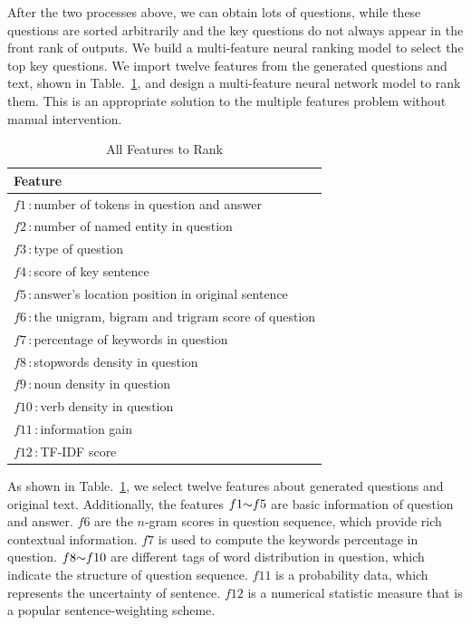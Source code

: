\documentclass[runningheads,UTF8,article]{comsis2}
\begin{document}
	After the two processes above, we can obtain lots of questions, while these questions are sorted arbitrarily and the key questions do not always appear in the front rank of outputs. We build a multi-feature neural ranking model to select the top key questions. We import twelve features from the generated questions and text, shown in Table.~\ref{features}, and design a multi-feature neural network model to rank them. This is an appropriate solution to the multiple features problem without manual intervention. 
	\begin{table}[!th]
		\centering
		\caption{All Features to Rank}
		\label{features}
		\setlength\tabcolsep{0.5em}
		\begin{tabular}{|p{200pt}|}
			\hline
			\textbf{Feature} \\
			\hline
			$ f1 $\,:\,number of tokens in question and answer\\ 
			$ f2 $\,:\,number of named entity in question \\   
			$ f3 $\,:\,type of question \\ 
			$ f4 $\,:\,score of key sentence  \\ 
			$ f5 $\,:\,answer's location position in original sentence  \\ 
			$ f6 $\,:\,the unigram, bigram and trigram score of question\\     			
			$ f7 $\,:\,percentage of keywords in question \\
			$ f8 $\,:\,stopwords density in question\\	
			$ f9 $\,:\,noun density in question\\
			$ f10 $\,:\,verb density in question \\
			
			$f11$\,:\,information gain \\
			$f12$\,:\,TF-IDF score   \\
			\hline 
		\end{tabular}	
	\end{table}
	
	
	
	
	
	As shown in Table.~\ref{features}, we select twelve features about generated questions and original text.
	Additionally, the features $f1
	\scriptsize{\sim}f5$ are basic information of question and answer. $f6$ are the $n$-gram scores in question sequence, which provide rich contextual information. $f7$ is used to compute the keywords percentage in question. $ f8 \scriptsize{\sim}f10$ are different tags of word distribution in question, which indicate the structure of question sequence. $ f11$ is a probability data, which represents the uncertainty of sentence. $ f12$ is a numerical statistic measure that is a popular sentence-weighting scheme. 
	
\end{document}
